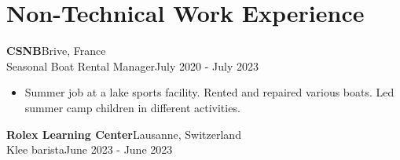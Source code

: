 \documentclass[a4paper, 10pt]{article}
\newenvironment{highlights}{
    \begin{itemize}[
        topsep=0.10 cm,
        parsep=0.10 cm,
        partopsep=0pt,
        itemsep=0pt,
        leftmargin=0.4 cm + 10pt
    ]
}{
    \end{itemize}
} %
\begin{document}
    
    
    \section{Non-Technical Work Experience}
    
    \textbf{CSNB}\hfill Brive, France\\
    Seasonal Boat Rental Manager\hfill July 2020 - July 2023
    \begin{highlights}
        \item Summer job at a lake sports facility. Rented and repaired various boats. Led summer
        camp children in different activities.
    \end{highlights}
    
    \textbf{Rolex Learning Center}\hfill Lausanne, Switzerland\\
    Klee barista\hfill June 2023 - June 2023
    
\end{document}
